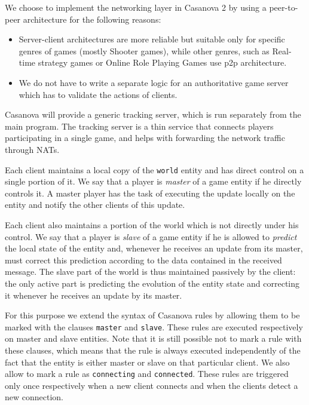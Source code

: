 We choose to implement the networking layer in Casanova 2 by using a peer-to-peer architecture for the following reasons:

\begin{itemize}
	\item Server-client architectures are more reliable but suitable only for specific genres of games (mostly Shooter games), while other genres, such as Real-time strategy games or Online Role Playing Games use p2p architecture.
	\item We do not have to write a separate logic for an authoritative game server which has to validate the actions of clients.
\end{itemize}

Casanova will provide a generic tracking server, which is run separately from the main program. The tracking server is a thin service that connects players participating in a single game, and helps with forwarding the network traffic through NATs.

Each client maintains a local copy of the \texttt{world} entity and has direct control on a single portion of it. We say that a player is \textit{master} of a game entity if he directly controls it. A master player has the task of executing the update locally on the entity and notify the other clients of this update.

Each client also maintains a portion of the world which is not directly under his control. We say that a player is \textit{slave} of a game entity if he is allowed to \textit{predict} the local state of the entity and, whenever he receives an update from its master, must correct this prediction according to the data contained in the received message. The slave part of the world is thus maintained passively by the client: the only active part is predicting the evolution of the entity state and correcting it whenever he receives an update by its master.

For this purpose we extend the syntax of Casanova rules by allowing them to be marked with the clauses \texttt{master} and \texttt{slave}. These rules are executed respectively on master and slave entities. Note that it is still possible not to mark a rule with these clauses, which means that the rule is always executed independently of the fact that the entity is either master or slave on that particular client. We also allow to mark a rule as \texttt{connecting} and \texttt{connected}. These rules are triggered only once respectively when a new client connects and when the clients detect a new connection.

